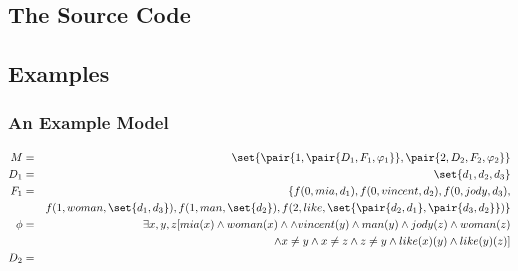 \documentclass[a4paper]{article}
\theoremstyle{remark}
\theoremstyle{remark}
\theoremstyle{definition}
\theoremstyle{definition}
\begin{document}
\subsection{The Source Code}

\subsection{Examples}

\subsubsection{An Example Model} \label{sec:examplemodel}

\begin{eqnarray*}
  M &=& \set{\pair{1,\pair{D_1,F_1,\varphi_1}},\pair{2,D_2,F_2,\varphi_2}} \\
  D_1 &=& \set{d_1,d_2,d_3} \\
  F_1 &=& \{f(0,mia,d_1), f(0,vincent,d_2), f(0,jody,d_3),\\
  && f(1,woman,\set{ d_1,d_3 }), f(1,man,\set{ d_2 }),
  f(2,like,\set{\pair{d_2,d_1},\pair{d_3,d_2}})\} \\
  \phi &=& \exists x,y,z [mia(x)\wedge woman(x)\wedge \wedge vincent(y)\wedge
  man(y)\wedge jody(z)\wedge woman(z) \\&&\wedge x \neq y \wedge x\neq z \wedge z
  \neq y\wedge like(x)(y)\wedge like(y)(z)]\\
  D_2 &=& 
\end{eqnarray*}

\newpage


\end{document}
